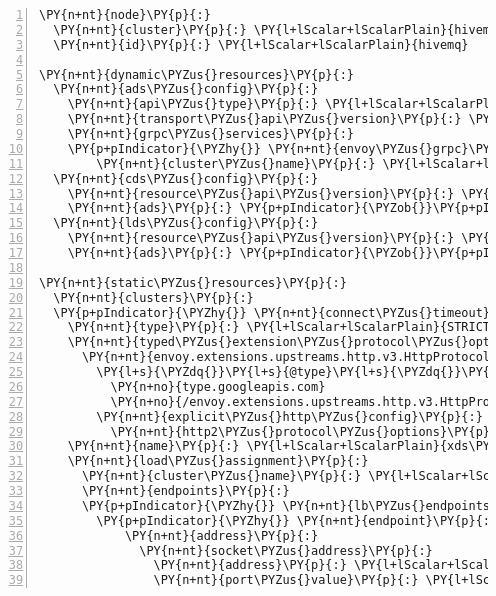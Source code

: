 \begin{Verbatim}[commandchars=\\\{\},numbers=left,firstnumber=1,stepnumber=1,frame=single]
\PY{n+nt}{node}\PY{p}{:}
  \PY{n+nt}{cluster}\PY{p}{:} \PY{l+lScalar+lScalarPlain}{hivemq\PYZhy{}controller}
  \PY{n+nt}{id}\PY{p}{:} \PY{l+lScalar+lScalarPlain}{hivemq}

\PY{n+nt}{dynamic\PYZus{}resources}\PY{p}{:}
  \PY{n+nt}{ads\PYZus{}config}\PY{p}{:}
    \PY{n+nt}{api\PYZus{}type}\PY{p}{:} \PY{l+lScalar+lScalarPlain}{GRPC}
    \PY{n+nt}{transport\PYZus{}api\PYZus{}version}\PY{p}{:} \PY{l+lScalar+lScalarPlain}{V3}
    \PY{n+nt}{grpc\PYZus{}services}\PY{p}{:}
    \PY{p+pIndicator}{\PYZhy{}} \PY{n+nt}{envoy\PYZus{}grpc}\PY{p}{:}
        \PY{n+nt}{cluster\PYZus{}name}\PY{p}{:} \PY{l+lScalar+lScalarPlain}{xds\PYZus{}cluster}
  \PY{n+nt}{cds\PYZus{}config}\PY{p}{:}
    \PY{n+nt}{resource\PYZus{}api\PYZus{}version}\PY{p}{:} \PY{l+lScalar+lScalarPlain}{V3}
    \PY{n+nt}{ads}\PY{p}{:} \PY{p+pIndicator}{\PYZob{}}\PY{p+pIndicator}{\PYZcb{}}
  \PY{n+nt}{lds\PYZus{}config}\PY{p}{:}
    \PY{n+nt}{resource\PYZus{}api\PYZus{}version}\PY{p}{:} \PY{l+lScalar+lScalarPlain}{V3}
    \PY{n+nt}{ads}\PY{p}{:} \PY{p+pIndicator}{\PYZob{}}\PY{p+pIndicator}{\PYZcb{}}

\PY{n+nt}{static\PYZus{}resources}\PY{p}{:}
  \PY{n+nt}{clusters}\PY{p}{:}
  \PY{p+pIndicator}{\PYZhy{}} \PY{n+nt}{connect\PYZus{}timeout}\PY{p}{:} \PY{l+lScalar+lScalarPlain}{1s}
    \PY{n+nt}{type}\PY{p}{:} \PY{l+lScalar+lScalarPlain}{STRICT\PYZus{}DNS}
    \PY{n+nt}{typed\PYZus{}extension\PYZus{}protocol\PYZus{}options}\PY{p}{:}
      \PY{n+nt}{envoy.extensions.upstreams.http.v3.HttpProtocolOptions}\PY{p}{:}
        \PY{l+s}{\PYZdq{}}\PY{l+s}{@type}\PY{l+s}{\PYZdq{}}\PY{p+pIndicator}{:} \PY{p+pIndicator}{\PYZgt{}}\PY{p+pIndicator}{\PYZhy{}}
          \PY{n+no}{type.googleapis.com}
          \PY{n+no}{/envoy.extensions.upstreams.http.v3.HttpProtocolOptions}
        \PY{n+nt}{explicit\PYZus{}http\PYZus{}config}\PY{p}{:}
          \PY{n+nt}{http2\PYZus{}protocol\PYZus{}options}\PY{p}{:} \PY{p+pIndicator}{\PYZob{}}\PY{p+pIndicator}{\PYZcb{}}
    \PY{n+nt}{name}\PY{p}{:} \PY{l+lScalar+lScalarPlain}{xds\PYZus{}cluster}
    \PY{n+nt}{load\PYZus{}assignment}\PY{p}{:}
      \PY{n+nt}{cluster\PYZus{}name}\PY{p}{:} \PY{l+lScalar+lScalarPlain}{xds\PYZus{}cluster}
      \PY{n+nt}{endpoints}\PY{p}{:}
      \PY{p+pIndicator}{\PYZhy{}} \PY{n+nt}{lb\PYZus{}endpoints}\PY{p}{:}
        \PY{p+pIndicator}{\PYZhy{}} \PY{n+nt}{endpoint}\PY{p}{:}
            \PY{n+nt}{address}\PY{p}{:}
              \PY{n+nt}{socket\PYZus{}address}\PY{p}{:}
                \PY{n+nt}{address}\PY{p}{:} \PY{l+lScalar+lScalarPlain}{example.controlplane.internal}
                \PY{n+nt}{port\PYZus{}value}\PY{p}{:} \PY{l+lScalar+lScalarPlain}{18000}
\end{Verbatim}
